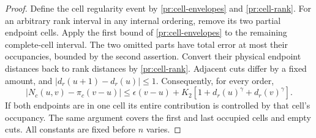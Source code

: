 \begin{proof}
Define the cell regularity event by \eqref{pr:cell-envelopes} and
\eqref{pr:cell-rank}. For an arbitrary rank interval in any internal
ordering, remove its two partial endpoint cells. Apply the first bound
of \eqref{pr:cell-envelopes} to the remaining complete-cell interval.
The two omitted parts have total error at most their occupancies, bounded
by the second assertion. Convert their physical endpoint distances back
to rank distances by \eqref{pr:cell-rank}. Adjacent cuts differ by a
fixed amount, and $|d_r(u+1)-d_r(u)|\le1$. Consequently, for every order,
\[
 |N_c(u,v)-\pi_c(v-u)|\le\epsilon(v-u)
          +K_2[1+d_r(u)^\gamma+d_r(v)^\gamma].
\]
If both endpoints are in one cell its entire contribution is controlled
by that cell's occupancy. The same argument covers the first and last
occupied cells and empty cuts. All constants are fixed before $n$ varies.
\end{proof}

